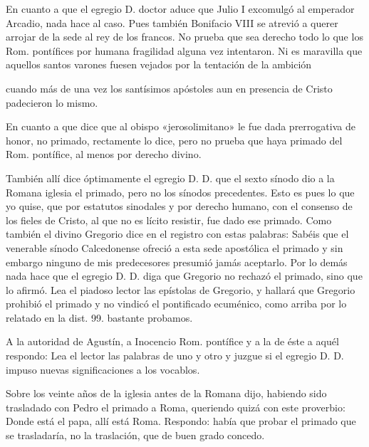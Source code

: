 En cuanto a que el egregio D. doctor aduce que Julio I excomulgó al emperador Arcadio, nada hace al caso. Pues también Bonifacio VIII se atrevió a querer arrojar de la sede al rey de los francos. No prueba que sea derecho todo lo que los Rom. pontífices por humana fragilidad alguna vez intentaron. Ni es maravilla que aquellos santos varones fuesen vejados por la tentación de la ambición

cuando más de una vez los santísimos apóstoles aun en presencia de Cristo padecieron lo mismo.

En cuanto a que dice que al obispo «jerosolimitano» le fue dada prerrogativa de honor, no primado, rectamente lo dice, pero no prueba que haya primado del Rom. pontífice, al menos por derecho divino.

También allí dice óptimamente el egregio D. D. que el sexto sínodo dio a la Romana iglesia el primado, pero no los sínodos precedentes. Esto es pues lo que yo quise, que por estatutos sinodales y por derecho humano, con el consenso de los fieles de Cristo, al que no es lícito resistir, fue dado ese primado. Como también el divino Gregorio dice en el registro con estas palabras: Sabéis que el venerable sínodo Calcedonense ofreció a esta sede apostólica el primado y sin embargo ninguno de mis predecesores presumió jamás aceptarlo. Por lo demás nada hace que el egregio D. D. diga que Gregorio no rechazó el primado, sino que lo afirmó. Lea el piadoso lector las epístolas\apnota{21}{M [epistolam.} de Gregorio, y hallará que Gregorio prohibió el primado y no vindicó el pontificado ecuménico, como arriba por lo relatado en la dist. 99. bastante probamos.

A la autoridad de Agustín, a Inocencio Rom. pontífice y a la de éste a aquél respondo: Lea el lector las palabras de uno y otro y juzgue si el egregio D. D. impuso nuevas significaciones a los vocablos.

Sobre los veinte años de la iglesia antes de la Romana dijo, habiendo sido trasladado con Pedro el primado a Roma, queriendo quizá con este proverbio: Donde está el papa, allí está Roma. Respondo: había que probar el primado que se trasladaría, no la traslación, que de buen grado concedo.

